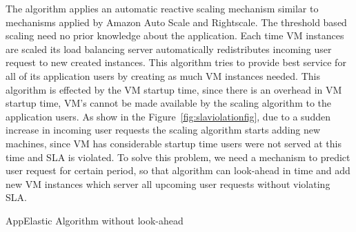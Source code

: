 The algorithm applies an automatic reactive scaling mechanism similar to mechanisms applied by Amazon Auto Scale and Rightscale\cite{han2012lightweight}. The threshold based scaling need no prior knowledge about the application. Each time VM instances are scaled its load balancing server automatically redistributes incoming user request to new created instances\cite{han2012lightweight}. This algorithm tries to provide best service for all of its application users by creating as much VM instances needed. This algorithm is effected by the VM startup time, since there is an overhead in VM startup time, VM's cannot be made available by the scaling algorithm to the application users. As show in the Figure~\ref{fig:slaviolationfig}, due to a sudden increase in incoming user requests the scaling algorithm starts adding new machines, since VM has considerable startup time users were not served at this time and SLA is violated. To solve this problem, we need a mechanism to predict user request for certain period, so that algorithm can look-ahead in time and add new VM instances which server all upcoming user requests without violating SLA.

\LinesNumbered
\begin{algorithm}[H]
 \caption{AppElastic Algorithm without look-ahead}
 \label{algo:appelasticwithoutlookahead}
\end{algorithm}

